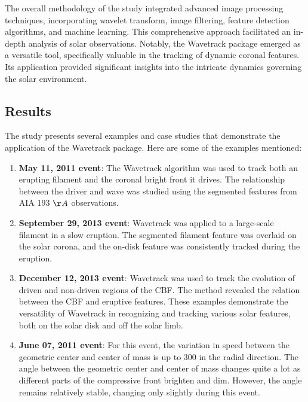 The overall methodology of the study integrated advanced image processing techniques, incorporating wavelet transform, image filtering, feature detection algorithms, and machine learning. This comprehensive approach facilitated an in-depth analysis of solar observations. Notably, the Wavetrack package emerged as a versatile tool, specifically valuable in the tracking of dynamic coronal features. Its application provided significant insights into the intricate dynamics governing the solar environment.

\subsection{Results}
The study presents several examples and case studies that demonstrate the application of the Wavetrack package. Here are some of the examples mentioned:

\begin{enumerate}
	\item \textbf{May 11, 2011 event}:
	The Wavetrack algorithm was used to track both an erupting filament and the coronal bright front it drives. The relationship between the driver and wave was studied using the segmented features from AIA 193 $\AA$ observations.
	
	\item \textbf{September 29, 2013 event}: Wavetrack was applied to a large-scale filament in a slow eruption. The segmented filament feature was overlaid on the solar corona, and the on-disk feature was consistently tracked during the eruption.
	
	\item \textbf{December 12, 2013 event}: Wavetrack was used to track the evolution of driven and non-driven regions of the CBF. The method revealed the relation between the CBF and eruptive features. These examples demonstrate the versatility of Wavetrack in recognizing and tracking various solar features, both on the solar disk and off the solar limb.
	
	\item \textbf{June 07, 2011 event}: For this event, the variation in speed between the geometric center and center of mass is up to 300 \kms in the radial direction. The angle between the geometric center and center of mass changes quite a lot as different parts of the compressive front brighten and dim. However, the angle remains relatively stable, changing only slightly during this event.
\end{enumerate}

